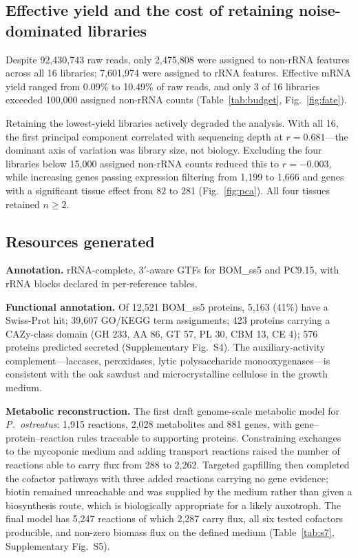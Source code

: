 \subsection{Effective yield and the cost of retaining noise-dominated libraries}

Despite 92,430,743 raw reads, only 2,475,808 were assigned to non-rRNA features across all 16
libraries; 7,601,974 were assigned to rRNA features. Effective mRNA yield ranged from 0.09\%
to 10.49\% of raw reads, and only 3 of 16 libraries exceeded 100,000 assigned non-rRNA counts
(Table~\ref{tab:budget}, Fig.~\ref{fig:fate}).

Retaining the lowest-yield libraries actively degraded the analysis. With all 16, the first
principal component correlated with sequencing depth at $r = 0.681$---the dominant axis of
variation was library size, not biology. Excluding the four libraries below 15,000 assigned
non-rRNA counts reduced this to $r = -0.003$, while increasing genes passing expression
filtering from 1,199 to 1,666 and genes with a significant tissue effect from 82 to 281
(Fig.~\ref{fig:pca}). All four tissues retained $n \geq 2$.

\subsection{Resources generated}

\textbf{Annotation.} rRNA-complete, 3$'$-aware GTFs for BOM\_ss5 and PC9.15, with rRNA blocks
declared in per-reference tables.

\textbf{Functional annotation.} Of 12,521 BOM\_ss5 proteins, 5,163 (41\%) have a Swiss-Prot
hit; 39,607 GO/KEGG term assignments; 423 proteins carrying a CAZy-class domain (GH 233,
AA 86, GT 57, PL 30, CBM 13, CE 4); 576 proteins predicted secreted (Supplementary Fig.~S4).
The auxiliary-activity complement---laccases, peroxidases, lytic polysaccharide
monooxygenases---is consistent with the oak sawdust and microcrystalline cellulose in the
growth medium.

\textbf{Metabolic reconstruction.} The first draft genome-scale metabolic model for
\textit{P.\ ostreatus}: 1,915 reactions, 2,028 metabolites and 881 genes, with
gene--protein--reaction rules traceable to supporting proteins. Constraining exchanges to the
mycoponic medium and adding transport reactions raised the number of reactions able to carry
flux from 288 to 2,262. Targeted gapfilling then completed the cofactor pathways with three
added reactions carrying no gene evidence; biotin remained unreachable and was supplied by the
medium rather than given a biosynthesis route, which is biologically appropriate for a likely
auxotroph. The final model has 5,247 reactions of which 2,287 carry flux, all six tested
cofactors producible, and non-zero biomass flux on the defined medium
(Table~\ref{tab:s7}, Supplementary Fig.~S5).

